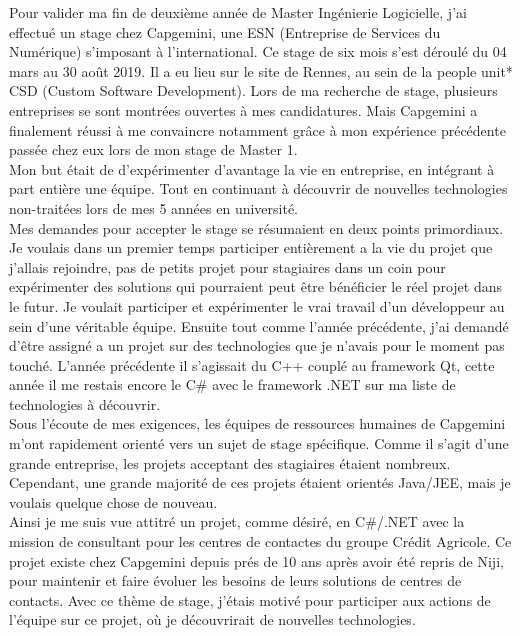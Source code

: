 \documentclass{rapport}
\begin{document}
Pour valider ma fin de deuxième année de Master Ingénierie Logicielle, j'ai effectué un stage chez Capgemini, une ESN (Entreprise de Services du Numérique) s'imposant à l'international. Ce stage de six mois s'est déroulé du 04 mars au 30 août 2019. Il a eu lieu sur le site de Rennes, au sein de la people unit* CSD (Custom Software Development).
Lors de ma recherche de stage, plusieurs entreprises se sont montrées ouvertes à mes candidatures. Mais Capgemini a finalement réussi à me convaincre notamment grâce à mon expérience précédente passée chez eux lors de mon stage de Master 1.
\\

Mon but était de d'expérimenter d'avantage la vie en entreprise, en intégrant à part entière une équipe. Tout en continuant à découvrir de nouvelles technologies non-traitées lors de mes 5 années en université.
\\
Mes demandes pour accepter le stage se résumaient en deux points primordiaux.
Je voulais dans un premier temps participer entièrement a la vie du projet que j'allais rejoindre, pas de petits projet pour stagiaires dans un coin pour expérimenter des solutions qui pourraient peut être bénéficier le réel projet dans le futur. Je voulait participer et expérimenter le vrai travail d'un développeur au sein d'une véritable équipe.
Ensuite tout comme l'année précédente, j'ai demandé d'être assigné a un projet sur des technologies que je n'avais pour le moment pas touché. L'année précédente il s'agissait du C++ couplé au framework Qt, cette année il me restais encore le C\# avec le framework .NET sur ma liste de technologies à découvrir.\\
Sous l'écoute de mes exigences, les équipes de ressources humaines de Capgemini m'ont rapidement orienté vers un sujet de stage spécifique. Comme il s'agit d'une grande entreprise, les projets acceptant des stagiaires étaient nombreux. Cependant, une grande majorité de ces projets étaient orientés Java/JEE, mais je voulais quelque chose de nouveau.\\

Ainsi je me suis vue attitré un projet, comme désiré, en C\#/.NET avec la mission de consultant pour les centres de contactes du groupe Crédit Agricole. Ce projet existe chez Capgemini depuis prés de 10 ans après avoir été repris de Niji, pour maintenir et faire évoluer les besoins de leurs solutions de centres de contacts. Avec ce thème de stage, j'étais motivé pour participer aux actions de l'équipe sur ce projet, où je découvrirait de nouvelles technologies.
\end{document}
